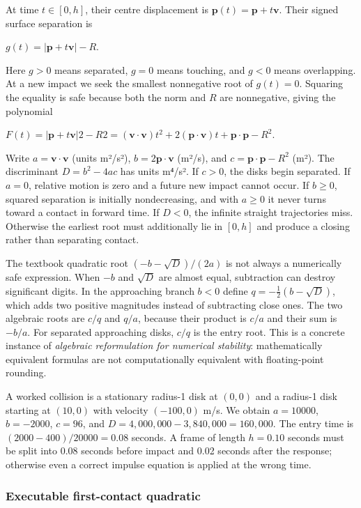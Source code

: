 At time \(t\in[0,h]\), their centre displacement is \(\mathbf p(t)=\mathbf p+t\mathbf v\). Their signed surface separation is

\(g(t)=|\mathbf p+t\mathbf v|-R.\)

Here \(g>0\) means separated, \(g=0\) means touching, and \(g<0\) means overlapping. At a new impact we seek the smallest nonnegative root of \(g(t)=0\). Squaring the equality is safe because both the norm and \(R\) are nonnegative, giving the polynomial

\(F(t)=|\mathbf p+t\mathbf v|2-R2 =(\mathbf v\cdot\mathbf v)t^2 +2(\mathbf p\cdot\mathbf v)t +\mathbf p\cdot\mathbf p-R^2.\)

Write \(a=\mathbf v\cdot\mathbf v\) (units m²/s²), \(b=2\mathbf p\cdot\mathbf v\) (m²/s), and \(c=\mathbf p\cdot\mathbf p-R^2\) (m²). The discriminant \(D=b^2-4ac\) has units m⁴/s². If \(c>0\), the disks begin separated. If \(a=0\), relative motion is zero and a future new impact cannot occur. If \(b\ge0\), squared separation is initially nondecreasing, and with \(a\ge0\) it never turns toward a contact in forward time. If \(D<0\), the infinite straight trajectories miss. Otherwise the earliest root must additionally lie in \([0,h]\) and produce a closing rather than separating contact.

The textbook quadratic root \((-b-\sqrt D)/(2a)\) is not always a numerically safe expression. When \(-b\) and \(\sqrt D\) are almost equal, subtraction can destroy significant digits. In the approaching branch \(b<0\) define \(q=-\tfrac12(b-\sqrt D)\), which adds two positive magnitudes instead of subtracting close ones. The two algebraic roots are \(c/q\) and \(q/a\), because their product is \(c/a\) and their sum is \(-b/a\). For separated approaching disks, \(c/q\) is the entry root. This is a concrete instance of \emph{algebraic reformulation for numerical stability}: mathematically equivalent formulas are not computationally equivalent with floating-point rounding.

A worked collision is a stationary radius-1 disk at \((0,0)\) and a radius-1 disk starting at \((10,0)\) with velocity \((-100,0)\) m/s. We obtain \(a=10000\), \(b=-2000\), \(c=96\), and \(D=4{,}000{,}000-3{,}840{,}000=160{,}000\). The entry time is \((2000-400)/20000=0.08\) seconds. A frame of length \(h=0.10\) seconds must be split into 0.08 seconds before impact and 0.02 seconds after the response; otherwise even a correct impulse equation is applied at the wrong time.

\subsubsection{Executable first-contact quadratic}\label{02-foundations-ii-ch031-executable-first-contact-quadratic}

